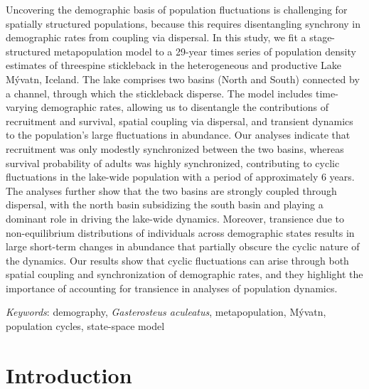 \documentclass[11pt]{article}
\begin{document}
Uncovering the demographic basis of population fluctuations is challenging 
for spatially structured populations, 
because this requires disentangling synchrony in demographic rates 
from coupling via dispersal. 
In this study, we fit a stage-structured metapopulation model to a 29-year times series 
of population density estimates of threespine stickleback in the heterogeneous 
and productive Lake M\'{y}vatn, Iceland. 
The lake comprises two basins (North and South) connected by a channel, 
through which the stickleback disperse. 
The model includes time-varying demographic rates, 
allowing us to disentangle the contributions of recruitment and survival, 
spatial coupling via dispersal, and transient dynamics 
to the population’s large fluctuations in abundance. 
Our analyses indicate that recruitment was only modestly synchronized between the two basins, 
whereas survival probability of adults was highly synchronized, 
contributing to cyclic fluctuations in the lake-wide population 
with a period of approximately 6 years. 
The analyses further show that the two basins are strongly coupled through dispersal, 
with the north basin subsidizing the south basin and playing a dominant role 
in driving the lake-wide dynamics. 
Moreover, transience due to non-equilibrium distributions of individuals 
across demographic states results in large short-term changes in abundance 
that partially obscure the cyclic nature of the dynamics. 
Our results show that cyclic fluctuations can arise through both spatial coupling 
and synchronization of demographic rates, and they highlight the importance 
of accounting for transience in analyses of population dynamics.


\bigskip

\textit{Keywords}: {demography, \textit{Gasterosteus aculeatus}, metapopulation,
                    M\'{y}vatn, population cycles, state-space model}

\clearpage




\section*{Introduction} \label{introduction}
\end{document}
